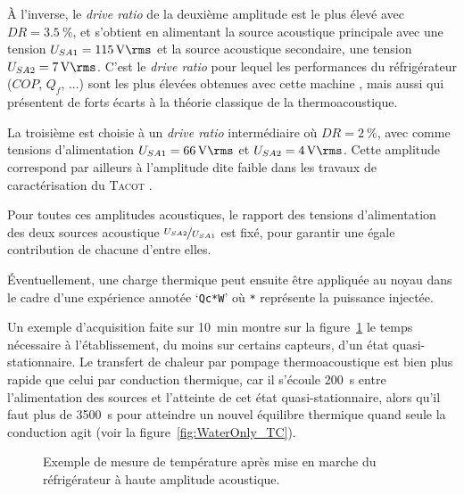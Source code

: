 À l'inverse, le \textit{drive ratio} de la deuxième amplitude est le plus élevé avec $DR=\qty{3.5}{\percent}$, et s'obtient en alimentant la source acoustique principale avec une tension $U_{SA1}=\qty{115}{\volt\rms}$ et la source acoustique secondaire, une tension $U_{SA2}=\qty{7}{\volt\rms}$. C'est le \textit{drive ratio} pour lequel les performances du réfrigérateur ($COP$, $Q_f$, ...) sont les plus élevées obtenues avec cette machine \cite{ramadan_design_2021}, mais aussi qui présentent de forts écarts à la théorie classique de la thermoacoustique. \smallskip

La troisième est choisie à un \textit{drive ratio} intermédiaire où $DR=\qty{2}{\percent}$, avec comme tensions d'alimentation $U_{SA1}=\qty{66}{\volt\rms}$ et $U_{SA2}=\qty{4}{\volt\rms}$. Cette amplitude correspond par ailleurs à l'amplitude dite \og faible \fg{} dans les travaux de caractérisation du \textsc{Tacot} \cite{ramadan_design_2021}.\smallskip

Pour toutes ces amplitudes acoustiques, le rapport des tensions d'alimentation des deux sources acoustique $\nicefrac{U_{SA2}}{U_{SA1}}$ est fixé, pour garantir une égale contribution de chacune d'entre elles.\medskip 




\'Eventuellement, une charge thermique peut ensuite être appliquée au noyau dans le cadre d'une expérience annotée `\texttt{Qc*W}' où \texttt{*} représente la puissance injectée.\bigskip

Un exemple d'acquisition faite sur \qty{10}{\minute} montre sur la figure~\ref{fig:AcouExample} le temps nécessaire à l'établissement, du moins sur certains capteurs, d'un état quasi-stationnaire. Le transfert de chaleur par pompage thermoacoustique est bien plus rapide que celui par conduction thermique, car il s'écoule \qty{200}{\second} entre l'alimentation des sources et l'atteinte de cet état quasi-stationnaire, alors qu'il faut plus de \qty{3500}{\second} pour atteindre un nouvel équilibre thermique quand seule la conduction agit (voir la figure~\ref{fig:WaterOnly_TC}).


\begin{figure}[!ht]
	\centering
	
	\caption{Exemple de mesure de température après mise en marche du réfrigérateur à haute amplitude acoustique.}
	\label{fig:AcouExample}
\end{figure}

